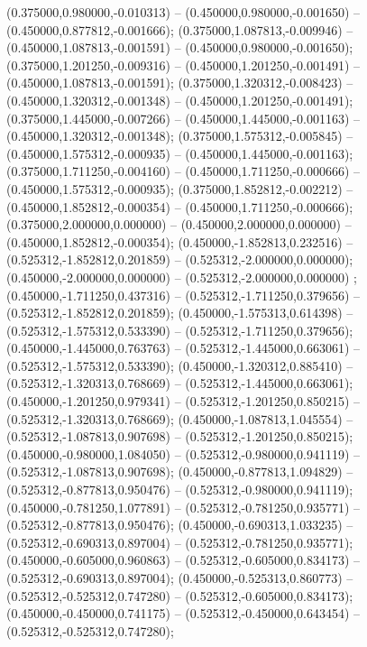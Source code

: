  (0.375000,0.980000,-0.010313) -- (0.450000,0.980000,-0.001650) -- (0.450000,0.877812,-0.001666);
 (0.375000,1.087813,-0.009946) -- (0.450000,1.087813,-0.001591) -- (0.450000,0.980000,-0.001650);
 (0.375000,1.201250,-0.009316) -- (0.450000,1.201250,-0.001491) -- (0.450000,1.087813,-0.001591);
 (0.375000,1.320312,-0.008423) -- (0.450000,1.320312,-0.001348) -- (0.450000,1.201250,-0.001491);
 (0.375000,1.445000,-0.007266) -- (0.450000,1.445000,-0.001163) -- (0.450000,1.320312,-0.001348);
 (0.375000,1.575312,-0.005845) -- (0.450000,1.575312,-0.000935) -- (0.450000,1.445000,-0.001163);
 (0.375000,1.711250,-0.004160) -- (0.450000,1.711250,-0.000666) -- (0.450000,1.575312,-0.000935);
 (0.375000,1.852812,-0.002212) -- (0.450000,1.852812,-0.000354) -- (0.450000,1.711250,-0.000666);
 (0.375000,2.000000,0.000000) -- (0.450000,2.000000,0.000000) -- (0.450000,1.852812,-0.000354);
 (0.450000,-1.852813,0.232516) -- (0.525312,-1.852812,0.201859) -- (0.525312,-2.000000,0.000000);
 (0.450000,-2.000000,0.000000) -- (0.525312,-2.000000,0.000000) ;
 (0.450000,-1.711250,0.437316) -- (0.525312,-1.711250,0.379656) -- (0.525312,-1.852812,0.201859);
 (0.450000,-1.575313,0.614398) -- (0.525312,-1.575312,0.533390) -- (0.525312,-1.711250,0.379656);
 (0.450000,-1.445000,0.763763) -- (0.525312,-1.445000,0.663061) -- (0.525312,-1.575312,0.533390);
 (0.450000,-1.320312,0.885410) -- (0.525312,-1.320313,0.768669) -- (0.525312,-1.445000,0.663061);
 (0.450000,-1.201250,0.979341) -- (0.525312,-1.201250,0.850215) -- (0.525312,-1.320313,0.768669);
 (0.450000,-1.087813,1.045554) -- (0.525312,-1.087813,0.907698) -- (0.525312,-1.201250,0.850215);
 (0.450000,-0.980000,1.084050) -- (0.525312,-0.980000,0.941119) -- (0.525312,-1.087813,0.907698);
 (0.450000,-0.877813,1.094829) -- (0.525312,-0.877813,0.950476) -- (0.525312,-0.980000,0.941119);
 (0.450000,-0.781250,1.077891) -- (0.525312,-0.781250,0.935771) -- (0.525312,-0.877813,0.950476);
 (0.450000,-0.690313,1.033235) -- (0.525312,-0.690313,0.897004) -- (0.525312,-0.781250,0.935771);
 (0.450000,-0.605000,0.960863) -- (0.525312,-0.605000,0.834173) -- (0.525312,-0.690313,0.897004);
 (0.450000,-0.525313,0.860773) -- (0.525312,-0.525312,0.747280) -- (0.525312,-0.605000,0.834173);
 (0.450000,-0.450000,0.741175) -- (0.525312,-0.450000,0.643454) -- (0.525312,-0.525312,0.747280);
